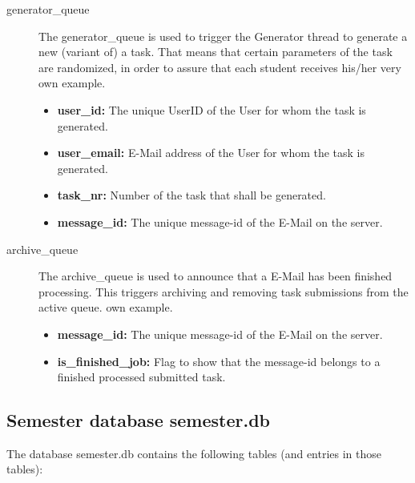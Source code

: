 \begin{description}
\item [generator\_queue] The generator\_queue is used to trigger the Generator thread 
	to generate a new (variant of) a task. That means that certain parameters of the 
	task are randomized, in order to assure that each student receives his/her very 
	own example. 
	\begin{itemize}
        \item {\bf user\_id:} The unique UserID of the User for whom the task is generated.
        \item {\bf user\_email:} E-Mail address of the User for whom the task is generated.
        \item {\bf task\_nr:} Number of the task that shall be generated.
        \item {\bf message\_id:} The unique message-id of the E-Mail on the server.
    \end{itemize}

\item [archive\_queue] The archive\_queue is used to announce that a E-Mail has been finished
	processing. This triggers archiving and removing task submissions from the active queue.
	own example. 
	\begin{itemize}
        \item {\bf message\_id:} The unique message-id of the E-Mail on the server.
        \item {\bf is\_finished\_job:} Flag to show that the message-id belongs to a finished 
			processed submitted task.
    \end{itemize}
\end{description}

\subsection{Semester database semester.db} \label{app:semester.db}

The database semester.db contains the following tables (and entries in those tables):

